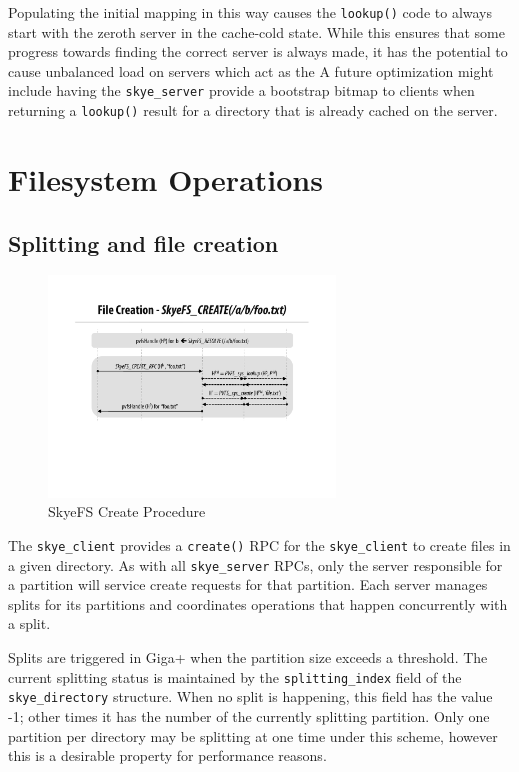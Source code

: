 \documentclass[twocolumn,letterpaper]{article}
\newcommand{\code}[1]{\texttt{#1}}
\begin{document}
Populating the initial mapping in this way causes the \code{lookup()} code to
always start with the zeroth server in the cache-cold state.  While this
ensures that some progress towards finding the correct server is always made,
it has the potential to cause unbalanced load on servers which act as the
A future optimization might include having the \code{skye\_server} provide a
bootstrap bitmap to clients when returning a \code{lookup()} result for a
directory that is already cached on the server.

\section{Filesystem Operations}
\subsection{Splitting and file creation}
\begin{figure}
\begin{center}
\includegraphics[width=3in]{figure-create}
\end{center}
\caption{SkyeFS Create Procedure}
\end{figure}
The \code{skye\_client} provides a \code{create()} RPC for the
\code{skye\_\-client} to create files in a given directory.  As with all
\code{skye\_server} RPCs, only the server responsible for a partition will
service create requests for that partition.  Each server manages splits for
its partitions and coordinates operations that happen concurrently with a
split.

Splits are triggered in Giga+ when the partition size exceeds a threshold.
The current splitting status is maintained by the \code{splitting\_\-index}
field of the \code{skye\_directory} structure.  When no split is happening,
this field has the value -1; other times it has the number of the currently
splitting partition.  Only one partition per directory may be splitting at one
time under this scheme, however this is a desirable property for performance
reasons.
\end{document}
